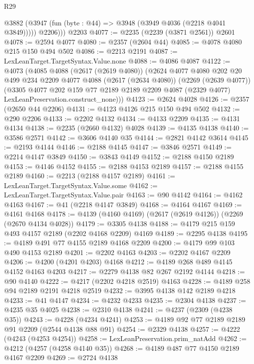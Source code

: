 \begin{lexlean}{R29}
\begin{coremodule}
        @3882 (@3947 (fun (byte : @44) => @3948 (@3949 @4036 (@2218 @4041 @3849)))))
          @2206)))
    @2203
@4077 := @2235 (@2239 (@3871 @2561)) @2601
@4078 := @2594 @4077
@4080 := @2357 (@2604 @44)
@4085 := @4078 @4080 @215 @150 @494 @502
@4086 := @2213 @2191
@4087 := LexLeanTarget.TargetSyntax.Value.none
@4088 := @4086 @4087
@4122 := @4073
    (@4085
      @4088
      (@2617 (@2619 @4080))
      (@2624
        @4077
        @4080
        @202
        @20
        @499
        @234
        @2209
        @4077
        @4088
        (@2617 (@2634 @4080))
        (@2269 (@2639 @4077))
        (@3305
          @4077
          @202
          @159
          @77
          @2189
          @2189
          @2209
          @4087
          (@2329 @4077)
          LexLeanPreservation.construct_none)))
@4123 := @2624 @4028
@4126 := @2357 (@2650 @44 @2206)
@4131 := @4123 @4126 @215 @150 @494 @502
@4132 := @290 @2206
@4133 := @2202 @4132
@4134 := @4133 @2209
@4135 := @4131 @4134
@4138 := @2235 (@2660 @4132) @4028
@4139 := @4135 @4138
@4140 := @3586 @2571
@4142 := @3606 @4140 @35
@4144 := @2821 @4142 @3614
@4145 := @2193 @4144
@4146 := @2188 @4145
@4147 := @3846 @2571
@4149 := @2214 @4147 @3849
@4150 := @3843 @4149
@4152 := @2188 @4150 @2189
@4153 := @4146 @4152
@4155 := @2188 @4153 @2189
@4157 := @2188 @4155 @2189
@4160 := @2213 (@2188 @4157 @2189)
@4161 := LexLeanTarget.TargetSyntax.Value.some
@4162 := LexLeanTarget.TargetSyntax.Value.pair
@4163 := @90 @4142
@4164 := @4162 @4163
@4167 := @41 (@2218 @4147 @3849)
@4168 := @4164 @4167
@4169 := @4161 @4168
@4178 := @4139 (@4160 @4169) (@2617 (@2619 @4126)) (@2269 (@2670 @4134 @4028))
@4179 := @3305 @4138
@4188 := @4179 @215 @159 @493 @4157 @2189 (@2202 @4168 @2209) @4169
@4189 := @2295 @4138
@4195 := @4189 @491 @77 @4155 @2189 @4168 @2209
@4200 := @4179 @99 @103 @490 @4153 @2189
@4201 := @2202 @4163
@4203 := @2202 @4167 @2209
@4206 := @4200 (@4201 @4203) @4168
@4212 := @4189 @268 @489 @4145 @4152 @4163 @4203
@4217 := @2279 @4138 @82 @267 @2192 @4144
@4218 := @90 @4140
@4222 := @4217 (@2202 @4218 @2519) @4163
@4228 := @4189 @258 @94 @2189 @2191 @4218 @2519
@4232 := @3995 @4138 @142 @2189 @4218
@4233 := @41 @4147
@4234 := @4232 @4233
@4235 := @2304 @4138
@4237 := @4235 @35 @4025
@4238 := @2310 @4138
@4241 := @4237 (@2309 (@4238 @35))
@4243 := @4228 (@4234 @4241)
@4253 := @4189 @92 @77 @2189 @2189 @91 @2209 (@2544 @4138 @88 @91)
@4254 := @2329 @4138
@4257 := @4222 (@4243 (@4253 @4254))
@4258 := LexLeanPreservation.prim_natAdd
@4262 := @4212 (@4257 (@4258 @4140 @35))
@4268 := @4189 @487 @77 @4150 @2189 @4167 @2209
@4269 := @2724 @4138

\end{coremodule}
\end{lexlean}
